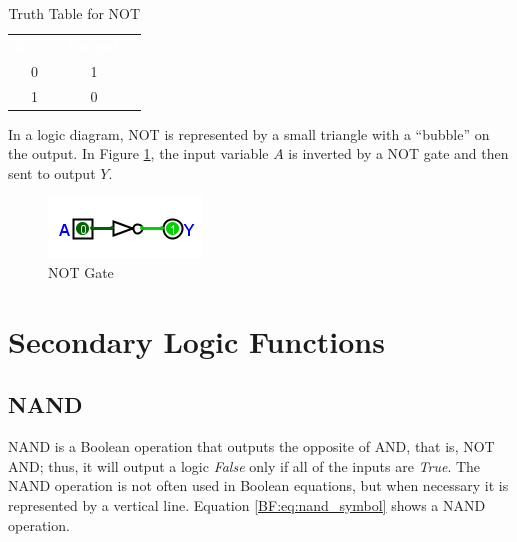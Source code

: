 \begin{table}[H]
  \sffamily
  \newcommand{\head}[1]{\textcolor{white}{\textbf{#1}}}    
  \begin{center}
    \begin{tabular}{ccc} 
      \rowcolor{black!75}
      \head{Input} & \head{Output} \\
      0 & 1 \\
      1 & 0 \\
    \end{tabular}
  \end{center}
  \caption{Truth Table for NOT}
  \label{BF:tab:truth_table_for_not}
\end{table}

In a logic diagram, \textsf{NOT}  is represented by a small triangle with a ``bubble'' on the output. In Figure \ref{fig:04_04}, the input variable $ A $ is inverted by a \textsf{NOT}  gate and then sent to output $ Y $. 

\begin{figure}[H]
	\centering
	\includegraphics[width=\maxwidth{.95\linewidth}]{gfx/04_04}
	\caption{NOT Gate}
	\label{fig:04_04}
\end{figure}


\section{Secondary Logic Functions}
\label{BF:sec:secondary_logic_functions}
\subsection{NAND}
\label{BF:subsec:nand}

\textsf{NAND} is a Boolean operation that outputs the opposite of \textsf{AND}, that is, \textsf{NOT AND}; thus, it will output a logic \emph{False} only if all of the inputs are \emph{True}. The \textsf{NAND} operation is not often used in Boolean equations, but when necessary it is represented by a vertical line. Equation \ref{BF:eq:nand_symbol} shows a \textsf{NAND}  operation.


